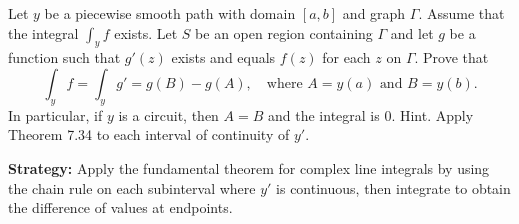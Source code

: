 \begin{problembox}
\begin{problemstatement}
Let \( y \) be a piecewise smooth path with domain \([a, b]\) and graph \(\Gamma\). Assume that the integral \( \int_y f \) exists. Let \( S \) be an open region containing \(\Gamma\) and let \( g \) be a function such that \( g'(z) \) exists and equals \( f(z) \) for each \( z \) on \(\Gamma\). Prove that
\[\int_y f = \int_y g' = g(B) - g(A), \quad \text{where } A = y(a) \text{ and } B = y(b).\]
In particular, if \( y \) is a circuit, then \( A = B \) and the integral is 0. Hint. Apply Theorem 7.34 to each interval of continuity of \( y' \).
\end{problemstatement}
\end{problembox}

\noindent\textbf{Strategy:} Apply the fundamental theorem for complex line integrals by using the chain rule on each subinterval where \( y' \) is continuous, then integrate to obtain the difference of values at endpoints.

